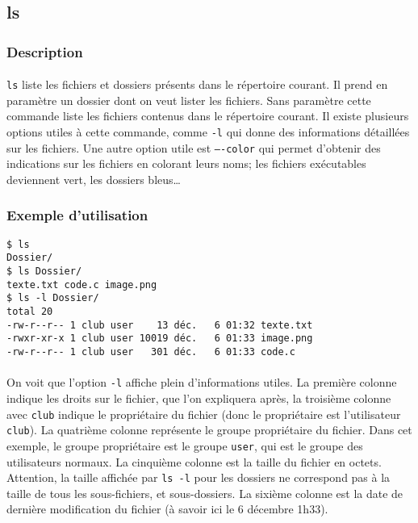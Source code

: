 \subsection{ls}
\subsubsection*{Description}

\paragraph{} \texttt{ls} liste les fichiers et dossiers présents dans le
répertoire courant. Il prend en paramètre un dossier dont on veut lister les
fichiers. Sans paramètre cette commande liste les fichiers contenus dans le
répertoire courant. Il existe plusieurs options utiles à cette commande, comme
\texttt{-l} qui donne des informations détaillées sur les fichiers. Une autre
option utile est \texttt{----color} qui permet d'obtenir des indications sur
les fichiers en colorant leurs noms; les fichiers exécutables
deviennent vert, les dossiers bleus\ldots

\subsubsection*{Exemple d'utilisation}
\begin{lstlisting}
$ ls
Dossier/
$ ls Dossier/
texte.txt code.c image.png
$ ls -l Dossier/
total 20
-rw-r--r-- 1 club user    13 déc.   6 01:32 texte.txt
-rwxr-xr-x 1 club user 10019 déc.   6 01:33 image.png
-rw-r--r-- 1 club user   301 déc.   6 01:33 code.c
\end{lstlisting}

\paragraph{} On voit que l'option \texttt{-l} affiche plein d'informations
utiles. La première colonne indique les droits sur le fichier, que l'on
expliquera après, la troisième colonne avec \texttt{club} indique le
propriétaire du fichier (donc le propriétaire est l'utilisateur \texttt{club}).
La quatrième colonne représente le groupe propriétaire du fichier. Dans cet
exemple, le groupe propriétaire est le groupe \texttt{user}, qui est le groupe
des utilisateurs normaux. La cinquième colonne est la taille du fichier en
octets. Attention, la taille affichée par \texttt{ls -l} pour les dossiers ne
correspond pas à la taille de tous les sous-fichiers, et sous-dossiers. La
sixième colonne est la date de dernière modification du fichier (à savoir ici
le 6 décembre 1h33).

